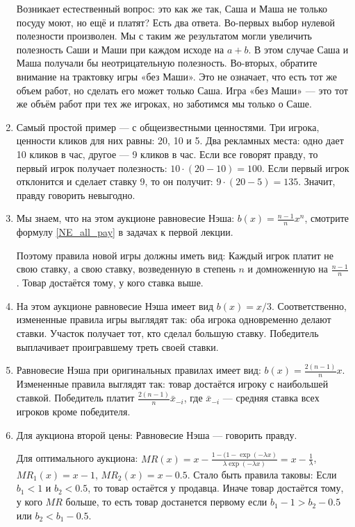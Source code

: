 \begin{enumerate}
Возникает естественный вопрос: это как же так, Саша и Маша не только посуду моют, но ещё и платят? Есть два ответа. Во-первых выбор нулевой полезности произволен. Мы с таким же результатом могли увеличить полезность Саши и Маши при каждом исходе на $ a+b $. В этом случае Саша и Маша получали бы неотрицательную полезность. Во-вторых, обратите внимание на трактовку игры «без Маши». Это не означает, что есть тот же объем работ, но сделать его может только Саша. Игра «без Маши» — это тот же объём работ при тех же игроках, но заботимся мы только о Саше.

\item Самый простой пример — с общеизвестными ценностями. Три игрока, ценности кликов для них равны: 20, 10 и 5. Два рекламных места: одно дает 10 кликов в час, другое — 9 кликов в час. Если все говорят правду, то первый игрок получает полезность: $ 10\cdot (20-10)=100 $. Если первый игрок отклонится и сделает ставку 9, то он получит: $ 9\cdot (20-5)=135 $. Значит, правду говорить невыгодно.

\item Мы знаем, что на этом аукционе равновесие Нэша: $ b(x)=\frac{n-1}{n}x^{n} $, смотрите формулу \ref{NE_all_pay} в задачах к первой лекции.

Поэтому правила новой игры должны иметь вид: Каждый игрок платит не свою ставку, а свою ставку, возведенную в степень $ n $ и домноженную на $ \frac{n-1}{n} $. Товар достаётся тому, у кого ставка выше.


\item На этом аукционе равновесие Нэша имеет вид $ b(x)=x/3 $. Соответственно, измененные правила игры выглядят так: оба игрока одновременно делают ставки. Участок получает тот, кто сделал большую ставку. Победитель выплачивает проигравшему треть своей ставки.

\item Равновесие Нэша при оригинальных правилах имеет вид: $ b(x)=\frac{2(n-1)}{n}x $. Измененные правила выглядят так: товар достаётся игроку с наибольшей ставкой. Победитель платит $ \frac{2(n-1)}{n}\bar{x}_{-i} $, где $ \bar{x}_{-i} $ — средняя ставка всех игроков кроме победителя.

\item Для аукциона второй цены: Равновесие Нэша — говорить правду.

Для оптимального аукциона: $ MR(x)=x-\frac{1-(1-\exp(-\lambda x)}{\lambda \exp(-\lambda x)}=x-\frac{1}{\lambda} $, $ MR_{1}(x)=x-1 $, $ MR_{2}(x)=x-0.5 $.  Стало быть правила таковы: Если $ b_{1}<1 $ и $ b_{2}<0.5 $, то товар остаётся у продавца. Иначе товар достаётся тому, у кого $ MR $ больше, то есть товар достанется первому если $ b_{1}-1>b_{2}-0.5 $ или
$b_{2}<b_{1}-0.5$.


\end{enumerate}
